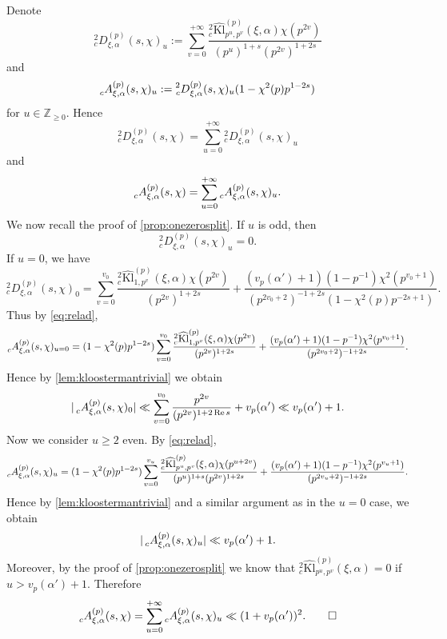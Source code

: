 \documentclass[10pt,oneside,reqno]{amsart}
\makeatletter
\newcommand\ZZ{\mathbb{Z}}
\renewcommand\Re{\mathop{\mathrm{Re}}}
\newcommand\Kl{\mathrm{Kl}}
\renewcommand\geq{\geqslant}
\theoremstyle{THEOREM}
\theoremstyle{DEFINITION}
\theoremstyle{EXERCISE}
\numberwithin{equation}{section}
\renewenvironment{proof}[1][\proofname]{\par
  \vspace{-6pt}
  \pushQED{\qed}
  \normalfont \topsep6\p@\@plus6\p@\relax
  \trivlist
  \item[\hskip\labelsep\rmfamily\bfseries
    #1\@addpunct{:}]\ignorespaces
}{
  \popQED\endtrivlist\@endpefalse
  \vspace{-6pt}
}
\makeatother
\begin{document}
\begin{proof}
Denote
\[
{}_c^2D_{\xi,\alpha}^{(p)}(s,\chi)_{u}:=\sum_{v=0}^{+\infty} \frac{{}_c^2\widehat{\Kl}^{(p)}_{p^u,p^v}(\xi,\alpha)\chi(p^{2v})}{(p^u)^{1+s} (p^{2v})^ {1+2s}}
\]
and
\[
\prescript{}{c}{A}_{\xi,\alpha}^{(p)}(s,\chi)_u:= \prescript{2}{c}D_{\xi,\alpha}^{(p)}(s,\chi)_u(1-\chi^2(p)p^{1-2s})
\]
for $u\in \ZZ_{\geq 0}$. Hence
\[
{}_c^2D_{\xi,\alpha}^{(p)}(s,\chi)=\sum_{u=0}^{+\infty}{}_c^2D_{\xi,\alpha}^{(p)}(s,\chi)_{u}
\]
and
\[
\prescript{}{c}{A}_{\xi,\alpha}^{(p)}(s,\chi)=\sum_{u=0}^{+\infty}\prescript{}{c}{A}_{\xi,\alpha}^{(p)}(s,\chi)_u.
\]
We now recall the proof of \autoref{prop:onezerosplit}. If $u$ is odd, then
\[
{}_c^2D_{\xi,\alpha}^{(p)}(s,\chi)_{u}=0.
\]
If $u=0$, we have
\[
{}_c^2D_{\xi,\alpha}^{(p)}(s,\chi)_{0}=\sum_{v=0}^{v_0} \frac{{}_c^2\widehat{\Kl}^{(p)}_{1,p^v}(\xi,\alpha)\chi(p^{2v})}{(p^{2v})^ {1+2s}}+\frac{(v_p(\alpha')+1) (1-p^{-1})\chi^2(p^{v_0+1})}{(p^{2v_0+2})^{-1+2s}(1-\chi^2(p)p^{-2s+1})}.
\]
Thus by \eqref{eq:relad},
\[
\prescript{}{c}{A}_{\xi,\alpha}^{(p)}(s,\chi)_{u=0}=(1-\chi^2(p)p^{1-2s})\sum_{v=0}^{v_0}\frac{{}_c^2\widehat{\Kl}^{(p)}_{1,p^v}(\xi,\alpha)\chi(p^{2v})}{(p^{2v})^ {1+2s}}+\frac{(v_p(\alpha')+1) (1-p^{-1})\chi^2(p^{v_0+1})}{(p^{2v_0+2})^{-1+2s}}.
\]
Hence by \autoref{lem:kloostermantrivial} we obtain
\[
|\prescript{}{c}{A}_{\xi,\alpha}^{(p)}(s,\chi)_{0}|\ll \sum_{v=0}^{v_0}\frac{p^{2v}}{(p^{2v})^ {1+2\Re s}}+v_p(\alpha')\ll v_p(\alpha')+1.
\]
Now we consider $u\geq 2$ even. By \eqref{eq:relad},
\[
\prescript{}{c}{A}_{\xi,\alpha}^{(p)}(s,\chi)_{u}=(1-\chi^2(p)p^{1-2s})\sum_{v=0}^{v_u}\frac{{}_c^2\widehat{\Kl}^{(p)}_{p^u,p^v}(\xi,\alpha)\chi(p^{u+2v})} {(p^u)^{1+s}(p^{2v})^ {1+2s}}+\frac{(v_p(\alpha')+1)(1-p^{-1})\chi^2(p^{v_u+1})}{(p^{2v_u+2})^{-1+2s} }.
\]
Hence by \autoref{lem:kloostermantrivial} and a similar argument as in the $u=0$ case, we obtain 
\[
|\prescript{}{c}{A}_{\xi,\alpha}^{(p)}(s,\chi)_{u}|\ll v_p(\alpha')+1.
\]
Moreover, by the proof of \autoref{prop:onezerosplit} we know that ${}_c^2\widehat{\Kl}^{(p)}_{p^u,p^v}(\xi,\alpha)=0$ if $u>v_p(\alpha')+1$. Therefore
\[
\prescript{}{c}{A}_{\xi,\alpha}^{(p)}(s,\chi)=\sum_{u=0}^{+\infty}\prescript{}{c}{A}_{\xi,\alpha}^{(p)}(s,\chi)_{u} \ll (1+v_p(\alpha'))^2.\qedhere
\]
\end{proof}
\end{document}

